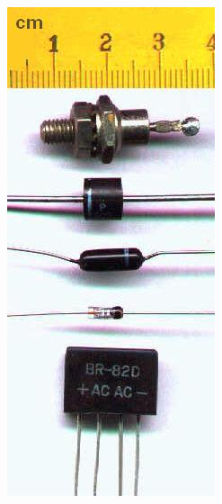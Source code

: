 \documentclass[10pt]{beamer}
\begin{document}
\begin{frame}
\begin{center}
\includegraphics[angle=90,width=\textwidth]{diode.jpg}
\end{center}
\end{frame}
\end{document}
